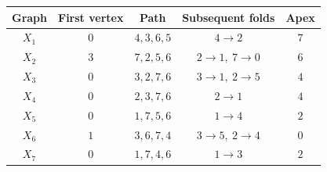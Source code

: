 \begin{tabular}{ccccc}
\toprule
Graph & First vertex & Path & Subsequent folds & Apex\\\midrule
\(X_1\)&\(0\)&\(4,3,6,5\)&\(4\to2\)&\(7\)\\
\(X_2\)&\(3\)&\(7,2,5,6\)&\(2\to1,\ 7\to0\)&\(6\)\\
\(X_3\)&\(0\)&\(3,2,7,6\)&\(3\to1,\ 2\to5\)&\(4\)\\
\(X_4\)&\(0\)&\(2,3,7,6\)&\(2\to1\)&\(4\)\\
\(X_5\)&\(0\)&\(1,7,5,6\)&\(1\to4\)&\(2\)\\
\(X_6\)&\(1\)&\(3,6,7,4\)&\(3\to5,\ 2\to4\)&\(0\)\\
\(X_7\)&\(0\)&\(1,7,4,6\)&\(1\to3\)&\(2\)\\
\bottomrule
\end{tabular}
